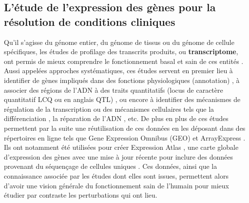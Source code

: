 

\subsection{L'étude de l'expression des gènes pour la résolution de conditions cliniques}

Qu'il s'agisse du génome entier, du génome de tissus ou du génome de cellule spécifiques, les études de profilage des transcrits produits, ou \textbf{transcriptome}, ont permis de mieux comprendre le fonctionnement basal et sain de ces entités \cite{Hughes2000, Cloonan2008Jul}. Aussi appelées approches systématiques, ces études servent en premier lieu à identifier de gènes impliqués dans des fonctions physiologiques (annotation) \cite{Munji2019Nov}, à associer des régions de l'ADN à des traits quantitatifs (locus de caractère quantitatif LCQ ou en anglais QTL) \cite{Sarkar2019Apr}, ou encore à identifier des mécanismes de régulation de la transcription \cite{Segales2016Dec} ou des mécanismes cellulaires tels que la différenciation \cite{Godoy2018Jul}, la réparation de l'ADN \cite{Jividen2018Dec}, etc. De plus en plus de ces études permettent par la suite une réutilisation de ces données en les déposant dans des répertoires en ligne tels que Gene Expression Omnibus (GEO) \cite{Barrett2013Jan} et ArrayExpress \cite{Athar2019Jan}. Ils ont notamment été utilisées pour créer Expression Atlas \cite{Lukk2010Apr}, une carte globale d'expression des gènes avec une mise à jour récente pour inclure des données provenant du séquençage de cellules uniques \cite{Papatheodorou2020Jan}. Ces données, ainsi que la connaissance associée par les études dont elles sont issues, permettent alors d'avoir une vision générale du fonctionnement sain de l'humain pour mieux étudier par contraste les perturbations qui ont lieu.

